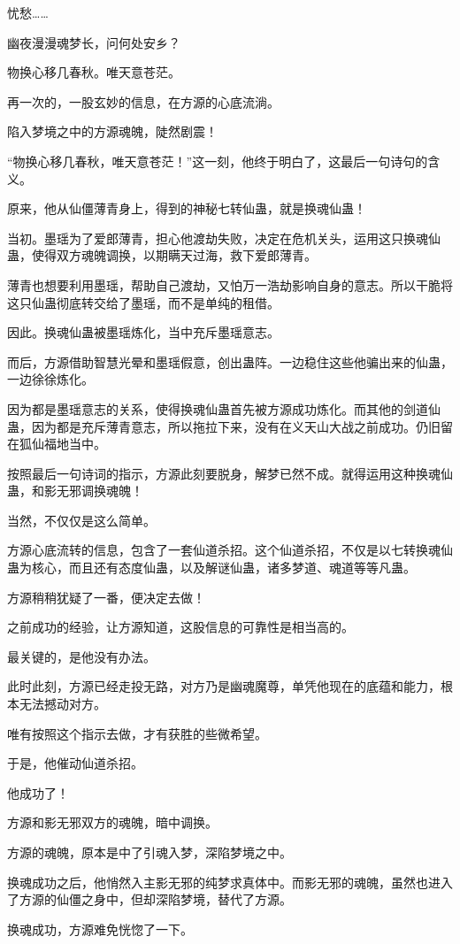 \begin{this_body}
忧愁……

幽夜漫漫魂梦长，问何处安乡？

物换心移几春秋。唯天意苍茫。

再一次的，一股玄妙的信息，在方源的心底流淌。

陷入梦境之中的方源魂魄，陡然剧震！

“物换心移几春秋，唯天意苍茫！”这一刻，他终于明白了，这最后一句诗句的含义。

原来，他从仙僵薄青身上，得到的神秘七转仙蛊，就是换魂仙蛊！

当初。墨瑶为了爱郎薄青，担心他渡劫失败，决定在危机关头，运用这只换魂仙蛊，使得双方魂魄调换，以期瞒天过海，救下爱郎薄青。

薄青也想要利用墨瑶，帮助自己渡劫，又怕万一浩劫影响自身的意志。所以干脆将这只仙蛊彻底转交给了墨瑶，而不是单纯的租借。

因此。换魂仙蛊被墨瑶炼化，当中充斥墨瑶意志。

而后，方源借助智慧光晕和墨瑶假意，创出蛊阵。一边稳住这些他骗出来的仙蛊，一边徐徐炼化。

因为都是墨瑶意志的关系，使得换魂仙蛊首先被方源成功炼化。而其他的剑道仙蛊，因为都是充斥薄青意志，所以拖拉下来，没有在义天山大战之前成功。仍旧留在狐仙福地当中。

按照最后一句诗词的指示，方源此刻要脱身，解梦已然不成。就得运用这种换魂仙蛊，和影无邪调换魂魄！

当然，不仅仅是这么简单。

方源心底流转的信息，包含了一套仙道杀招。这个仙道杀招，不仅是以七转换魂仙蛊为核心，而且还有态度仙蛊，以及解谜仙蛊，诸多梦道、魂道等等凡蛊。

方源稍稍犹疑了一番，便决定去做！

之前成功的经验，让方源知道，这股信息的可靠性是相当高的。

最关键的，是他没有办法。

此时此刻，方源已经走投无路，对方乃是幽魂魔尊，单凭他现在的底蕴和能力，根本无法撼动对方。

唯有按照这个指示去做，才有获胜的些微希望。

于是，他催动仙道杀招。

他成功了！

方源和影无邪双方的魂魄，暗中调换。

方源的魂魄，原本是中了引魂入梦，深陷梦境之中。

换魂成功之后，他悄然入主影无邪的纯梦求真体中。而影无邪的魂魄，虽然也进入了方源的仙僵之身中，但却深陷梦境，替代了方源。

换魂成功，方源难免恍惚了一下。


\end{this_body}
